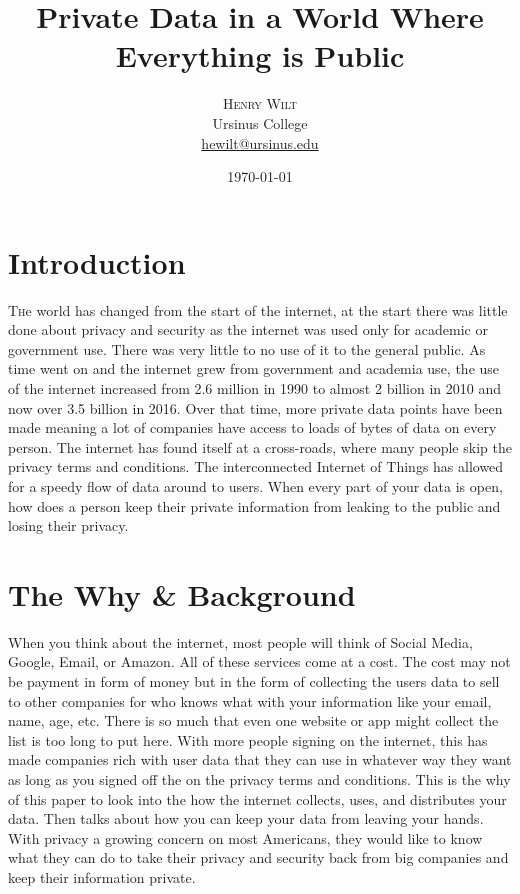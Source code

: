 \documentclass[10.5pt, twoside,twocolumn]{article}
\title{Private Data in a World Where Everything is Public} %
\author{%
\textsc{Henry Wilt} \\[1ex]%
\normalsize Ursinus College \\ %
\normalsize \href{mailto:hewilt@ursinus.edu}{hewilt@ursinus.edu} %
}
\date{\today} %
\begin{document}
\maketitle

\section{Introduction}

\lettrine[nindent=0em,lines=2]{T}he world has changed from the start of the internet, at the start there was little done about privacy and security as the internet was used only for academic or government use. There was very little to no use of it to the general public. As time went on and the internet grew from government and academia use, the use of the internet increased from 2.6 million in 1990 to almost 2 billion in 2010 and now over 3.5 billion in 2016\cite{owidinternet}. Over that time, more private data points have been made meaning a lot of companies have access to loads of bytes of data on every person. The internet has found itself at a cross-roads, where many people skip the privacy terms and conditions\cite{auxier_rainie_anderson_perrin_kumar_turner_2020}. The interconnected Internet of Things has allowed for a speedy flow of data around to users. When every part of your data is open, how does a person keep their private information from leaking to the public and losing their privacy. 


\section{The Why \& Background}
When you think about the internet, most people will think of Social Media, Google, Email, or Amazon. All of these services come at a cost. The cost may not be payment in form of money but in the form of collecting the users data to sell to other companies for who knows what with your information like your email, name, age, etc. There is so much that even one website or app might collect the list is too long to put here. With more people signing on the internet, this has made companies rich with user data that they can use in whatever way they want as long as you signed off the on the privacy terms and conditions. This is the why of this paper to look into the how the internet collects, uses, and distributes your data. Then talks about how you can keep your data from leaving your hands. With privacy a growing concern on most Americans\cite{auxier_rainie_anderson_perrin_kumar_turner_2020}, they would like to know what they can do to take their privacy and security back from big companies and keep their information private.
\end{document}
